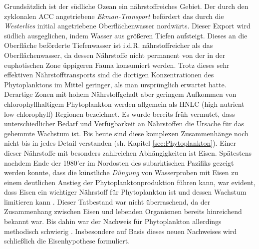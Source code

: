 \documentclass[12pt,a4paper,onecolumn]{scrartcl}
\begin{document}
Grundsätzlich ist der südliche Ozean ein nährstoffreiches Gebiet. Der durch den zyklonalen ACC angetriebene \textit{Ekman-Transport} befördert das durch die \textit{Westerlies} initial angetriebene Oberflächenwasser nordwärts. Dieser Export wird südlich ausgeglichen, indem Wasser aus größeren Tiefen aufsteigt. Dieses an die Oberfläche beförderte Tiefenwasser ist i.d.R. nährstoffreicher als das Oberflächenwasser, da dessen Nährstoffe nicht permanent von der in der euphotischen Zone üppigeren Fauna konsumiert werden. Trotz dieses sehr effektiven Nährstofftransports sind die dortigen Konzentrationen des Phytoplanktons im Mittel geringer, als man ursprünglich erwartet hatte. Derartige Zonen mit hohem Nährstoffgehalt aber geringem Aufkommen von chlorophyllhaltigem Phytoplankton werden allgemein als HNLC (high nutrient low chlorophyll) Regionen bezeichnet. Es wurde bereits früh vermutet, dass unterschiedlicher Bedarf und Verfügbarkeit an Nährstoffen die Ursache für das gehemmte Wachstum ist. Bis heute sind diese komplexen Zusammenhänge noch nicht bis in jedes Detail verstanden (sh. Kapitel \ref{sec:Phytoplankton}). Einer dieser Nährstoffe mit besonders zahlreichen Abhängigkeiten ist Eisen. Spätestens nachdem Ende der 1980'er im Nordosten des subarktischen Pazifiks gezeigt werden konnte, dass die künstliche \textit{Düngung} von Wasserproben mit Eisen zu einem deutlichen Anstieg der Phytoplanktonproduktion führen kann, war evident, dass Eisen ein wichtiger Nährstoff für Phytoplankton ist und dessen Wachstum limitieren kann \citep{Martin.1988}. Dieser Tatbestand war nicht überraschend, da der Zusammenhang zwischen Eisen und lebenden Organismen bereits hinreichend bekannt war. Bis dahin war der Nachweis für Phytoplankton allerdings methodisch schwierig \citep{Martin.1988}. Insbesondere auf Basis dieses neuen Nachweises wird schließlich die Eisenhypothese formuliert. \\
\end{document}

